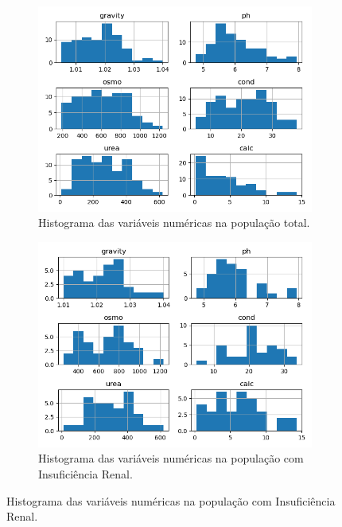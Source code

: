 \begin{figure}[H]
     \centering
     \begin{subfigure}[b]{0.3\textwidth}
         \ \caption{Histograma das variáveis numéricas na população total.}
 \label{fig:var:1:kindney}
 \centering
\includegraphics[scale=0.3]{images/hist_kindey_t.png}
     \end{subfigure}
     \hfill
     \begin{subfigure}[b]{0.3\textwidth}
         \centering
         \caption{Histograma das variáveis numéricas na população com Insuficiência Renal.}
 \label{fig:var:2:kindney}
 \centering
\includegraphics[scale=0.3]{images/hist_kindey_yes.png}
     \end{subfigure}

\end{figure}
